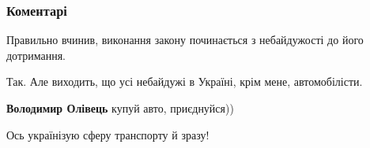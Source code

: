  
 
 
 
 
\subsubsection{Коментарі}

\begin{itemize}
 
Правильно вчинив, виконання закону починається з небайдужості до його дотримання.

\begin{itemize}
 
Так. Але виходить, що усі небайдужі в Україні, крім мене, автомобілісти.

 
\textbf{Володимир Олівець} купуй авто, приєднуйся))

 
Ось українізую сферу транспорту й зразу!
\end{itemize}

 

\end{itemize}
